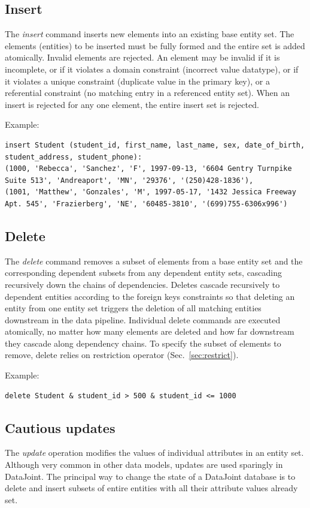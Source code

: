 \documentclass[letter,10pt]{article}
\newcommand{\datajoint}{DataJoint\xspace}
\begin{document}
\subsection{Insert}
The \emph{insert} command inserts new elements into an existing base entity set.  
The elements (entities) to be inserted must be fully formed and the entire set is added atomically.
Invalid elements are rejected. 
An element may be invalid if it is incomplete, or if it violates a domain constraint (incorrect value datatype), or if it violates a unique constraint (duplicate value in the primary key), or a referential constraint (no matching entry in a referenced entity set).
When an insert is rejected for any one element, the entire insert set is rejected.

Example:
\begin{lstlisting}[language=dj]
insert Student (student_id, first_name, last_name, sex, date_of_birth, student_address, student_phone):
(1000, 'Rebecca', 'Sanchez', 'F', 1997-09-13, '6604 Gentry Turnpike Suite 513', 'Andreaport', 'MN', '29376', '(250)428-1836'),
(1001, 'Matthew', 'Gonzales', 'M', 1997-05-17, '1432 Jessica Freeway Apt. 545', 'Frazierberg', 'NE', '60485-3810', '(699)755-6306x996')
\end{lstlisting}

\subsection{Delete}\label{sec:delete}
The \emph{delete} command removes a subset of elements from a base entity set and the corresponding dependent subsets from any dependent entity sets, cascading recursively down the chains of dependencies.
Deletes cascade recursively to dependent entities according to the foreign keys constraints so that deleting an entity from one entity set triggers the deletion of all matching entities downstream in the data pipeline.
Individual delete commands are executed atomically, no matter how many elements are deleted and how far downstream they cascade along dependency chains.
To specify the subset of elements to remove, delete relies on restriction operator (Sec.\ \ref{sec:restrict}).

Example: 
\begin{lstlisting}[language=dj]
delete Student & student_id > 500 & student_id <= 1000
\end{lstlisting}

\subsection{Cautious updates}
The \emph{update} operation modifies the values of individual attributes in an entity set.
Although very common in other data models, updates are used sparingly in \datajoint. 
The principal way to change the state of a \datajoint database is to delete and insert subsets of entire entities with all their attribute values already set. 
\end{document}
